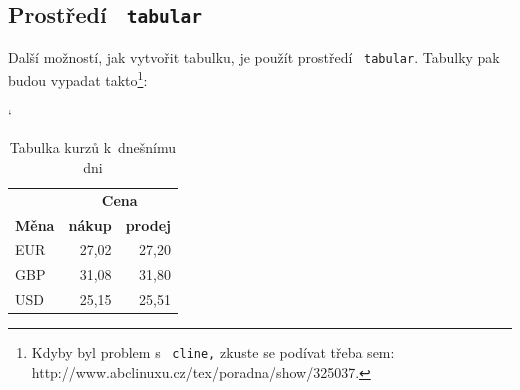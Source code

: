 \documentclass[czech,a4paper,11pt]{article}
\begin{document}
\subsection{Prostředí \ \texttt{tabular}}
Další možností, jak vytvořit tabulku, je použít prostředí \ \texttt{tabular}. Tabulky pak budou vypadat takto\footnote{Kdyby byl problem s \ \texttt{cline,} zkuste se podívat třeba sem: http://www.abclinuxu.cz/tex/poradna/show/325037.}:
\bigskip
\begin{table}[h]
\begin{center}
\catcode`
\begin{tabular}{| l | r | r |} \hline
& \multicolumn{2}{|c|}{\textbf{Cena}} \\ \cline{2-3}
\textbf{Měna} & \textbf{nákup} & \textbf{prodej} \\ \hline
EUR & 27,02 & 27,20 \\
GBP & 31,08 & 31,80 \\
USD & 25,15 & 25,51 \\ \hline
\end{tabular}
\caption{Tabulka kurzů k~dnešnímu dni}
\label{table_1}
\end{center}
\end{table}
\end{document}
